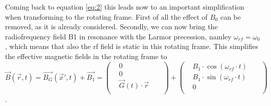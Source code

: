 \documentclass[a4paper,12pt]{extarticle}
\begin{document}
Coming back to equation \eqref{eq:2} this leads now to an important simplification when transforming to the rotating frame. First of all the effect of $B_0$ can be removed, as it is already considered. Secondly, we can now bring the radiofrequency field B1 in resonance with the Larmor precession, namley $\omega_{rf} = \omega_0$, which means that also the rf field is static in this rotating frame. This simplifies the effective magnetic fields in the rotating frame to
 \begin{equation} 
 \vec{B}(\vec{r},t)  =  \vec{B_G}(\vec{x}',t) + \vec{B_1} = 
  \begin{pmatrix}
  & 0 \\
& 0 \\
& \vec{G}(t)\cdot\vec{r} &  & \\
\end{pmatrix}
+
 \begin{pmatrix}
  & B_1\cdot \cos(\omega_{rf}\cdot t) \\
& B_1\cdot \sin(\omega_{rf}\cdot t) \\
& 0 &  & \\
\end{pmatrix}
 \end{equation}.
 
\end{document}
